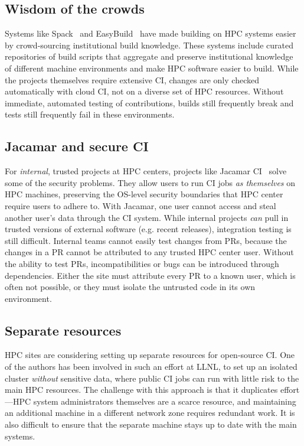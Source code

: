 \documentclass{IEEEcsmag}
\begin{document}
\subsection{Wisdom of the crowds}

Systems like Spack~\cite{gamblin+:sc15} and EasyBuild~\cite{hoste+:pyhpc12} have made
building on HPC systems easier by crowd-sourcing institutional build knowledge. These
systems include curated repositories of build scripts that aggregate and preserve
institutional knowledge of different machine environments and make HPC software easier
to build. While the projects themselves require extensive CI, changes are only checked
automatically with cloud CI, not on a diverse set of HPC resources. Without immediate,
automated testing of contributions, builds still frequently break and tests still frequently
fail in these environments.


\subsection{Jacamar and secure CI}

For {\it internal}, trusted projects at HPC centers, projects like Jacamar CI~\cite{jacamar-ci}
solve some of the security problems. They allow users to run CI jobs {\it as themselves} on HPC
machines, preserving the OS-level security boundaries that HPC center require users to
adhere to. With Jacamar, one user cannot access and steal another user's data through the CI
system.
While internal projects {\it can} pull in trusted versions of external
software (e.g. recent releases), integration testing is still difficult. Internal
teams cannot easily test changes from PRs, because the changes in a PR cannot be
attributed to any trusted HPC center user. Without the ability to test PRs, incompatibilities
or bugs can be introduced through dependencies. Either the site must attribute every
PR to a known user, which is often not possible, or they must isolate the untrusted code
in its own environment.

\subsection{Separate resources}

HPC sites are considering setting up separate resources for open-source CI. One of the
authors has been involved in such an effort at LLNL, to set up an isolated cluster {\it
  without} sensitive data, where public CI jobs can run with little risk to the main
HPC resources. The challenge with this approach is that it
duplicates effort---HPC system administrators themselves are a scarce resource, and
maintaining an additional machine in a different network zone requires redundant work.
It is also difficult to ensure that the separate machine stays up to date with the main
systems.
\end{document}
